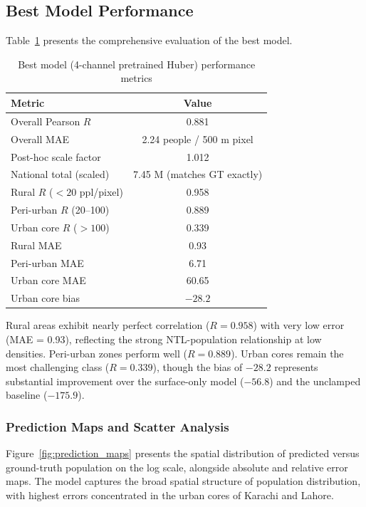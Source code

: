 \documentclass[12pt,a4paper]{article}
\begin{document}
\subsection{Best Model Performance}
\label{subsec:best}

Table~\ref{tab:best} presents the comprehensive evaluation of the best model.

\begin{table}[H]
\centering
\caption{Best model (4-channel pretrained Huber) performance metrics}
\label{tab:best}
\begin{tabular}{@{}lc@{}}
\toprule
\textbf{Metric} & \textbf{Value} \\
\midrule
Overall Pearson $R$ & 0.881 \\
Overall MAE & 2.24 people / 500 m pixel \\
Post-hoc scale factor & 1.012 \\
National total (scaled) & 7.45 M (matches GT exactly) \\
\midrule
Rural $R$ ($< 20$ ppl/pixel) & 0.958 \\
Peri-urban $R$ (20--100) & 0.889 \\
Urban core $R$ ($> 100$) & 0.339 \\
\midrule
Rural MAE & 0.93 \\
Peri-urban MAE & 6.71 \\
Urban core MAE & 60.65 \\
Urban core bias & $-28.2$ \\
\bottomrule
\end{tabular}
\end{table}

Rural areas exhibit nearly perfect correlation ($R = 0.958$) with very low error (MAE = 0.93), reflecting the strong NTL-population relationship at low densities. Peri-urban zones perform well ($R = 0.889$). Urban cores remain the most challenging class ($R = 0.339$), though the bias of $-28.2$ represents substantial improvement over the surface-only model ($-56.8$) and the unclamped baseline ($-175.9$).

\subsubsection{Prediction Maps and Scatter Analysis}

Figure~\ref{fig:prediction_maps} presents the spatial distribution of predicted versus ground-truth population on the log scale, alongside absolute and relative error maps. The model captures the broad spatial structure of population distribution, with highest errors concentrated in the urban cores of Karachi and Lahore.
\end{document}
